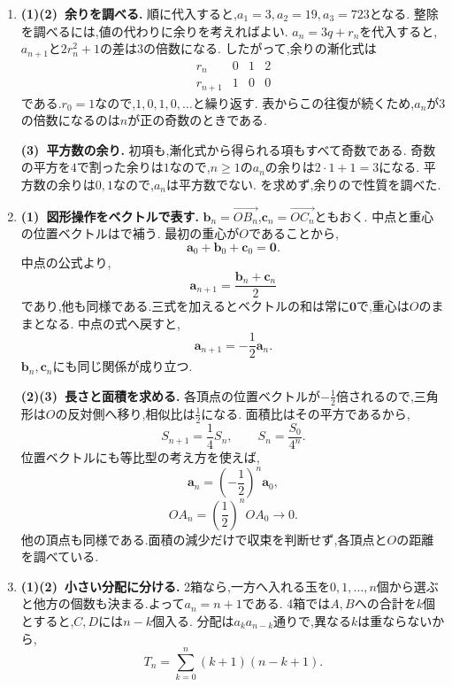 \begin{enumerate}[label=\textbf{問\arabic*.},leftmargin=3.8em,format=\bookitemlink{practice-bridge}{solution}{problem}]
    \smallskip
    \textbf{(3)~隣接3項間型へ.}
    の「項数と添字の間隔」に沿って
    \[
      t^2-t-1=0
    \]
    を作る.異なる二つの解は$\alpha,\beta$であるから,
    \[
      c_n=A\alpha^n+B\beta^n
    \]
    と書ける.$c_0=1,c_1=2$を代入すると,
    \[
      A=\frac{\alpha^2}{\sqrt5},\qquad
      B=-\frac{\beta^2}{\sqrt5}
    \]
    となり,解答の式を得る.
    解に無理数が現れても,数えているものが文字列の個数なので,得られる値は整数である.
  \item \textbf{(1)(2)~余りを調べる.}
    順に代入すると,$a_1=3,a_2=19,a_3=723$となる.
    整除を調べるには,値の代わりに余りを考えればよい.
    $a_n=3q+r_n$を代入すると,$a_{n+1}$と$2r_n^2+1$の差は$3$の倍数になる.
    したがって,余りの漸化式は
    \[
      \begin{array}{c|ccc}
        r_n&0&1&2\\ \hline
        r_{n+1}&1&0&0
      \end{array}
    \]
    である.$r_0=1$なので,$1,0,1,0,\ldots$と繰り返す.
    表からこの往復が続くため,$a_n$が$3$の倍数になるのは$n$が正の奇数のときである.

    \smallskip
    \textbf{(3)~平方数の余り.}
    初項も,漸化式から得られる項もすべて奇数である.
    奇数の平方を$4$で割った余りは$1$なので,$n\ge1$の$a_n$の余りは$2\cdot1+1=3$になる.
    平方数の余りは$0,1$なので,$a_n$は平方数でない.
    を求めず,余りので性質を調べた.
  \item \textbf{(1)~図形操作をベクトルで表す.}
    $\boldsymbol b_n=\overrightarrow{OB_n}$,$\boldsymbol c_n=\overrightarrow{OC_n}$ともおく.
    中点と重心の位置ベクトルはで補う.
    最初の重心が$O$であることから,
    \[
      \boldsymbol a_0+\boldsymbol b_0+\boldsymbol c_0
      =\boldsymbol0.
    \]
    中点の公式より,
    \[
      \boldsymbol a_{n+1}
      =\frac{\boldsymbol b_n+\boldsymbol c_n}{2}
    \]
    であり,他も同様である.三式を加えるとベクトルの和は常に$\boldsymbol0$で,重心は$O$のままとなる.
    中点の式へ戻すと,
    \[
      \boldsymbol a_{n+1}=-\frac12\boldsymbol a_n.
    \]
    $\boldsymbol b_n,\boldsymbol c_n$にも同じ関係が成り立つ.

    \smallskip
    \textbf{(2)(3)~長さと面積を求める.}
    各頂点の位置ベクトルが$-\frac12$倍されるので,三角形は$O$の反対側へ移り,相似比は$\frac12$になる.
    面積比はその平方であるから,
    \[
      S_{n+1}=\frac14S_n,\qquad S_n=\frac{S_0}{4^n}.
    \]
    位置ベクトルにも等比型の考え方を使えば,
    \[
      \boldsymbol a_n=\left(-\frac12\right)^n\boldsymbol a_0,
    \]
    \[
      OA_n=\left(\frac12\right)^n OA_0\longrightarrow0.
    \]
    他の頂点も同様である.面積の減少だけで収束を判断せず,各頂点と$O$の距離を調べている.
  \item \textbf{(1)(2)~小さい分配に分ける.}
    2箱なら,一方へ入れる玉を$0,1,\ldots,n$個から選ぶと他方の個数も決まる.よって$a_n=n+1$である.
    4箱では$A,B$への合計を$k$個とすると,$C,D$には$n-k$個入る.
    分配は$a_ka_{n-k}$通りで,異なる$k$は重ならないから,
    \[
      T_n=\sum_{k=0}^{n}(k+1)(n-k+1).
    \]


\end{enumerate}
